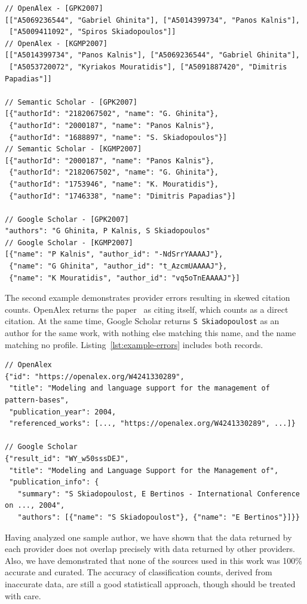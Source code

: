 \begin{lstlisting}[float=tb, basicstyle=\footnotesize\ttfamily, caption={Authors of {[GPK2007]} and {[KGMP2007]}, as returned by providers}, label={lst:example-coauthor}]
// OpenAlex - [GPK2007]
[["A5069236544", "Gabriel Ghinita"], ["A5014399734", "Panos Kalnis"],
 ["A5009411092", "Spiros Skiadopoulos"]]
// OpenAlex - [KGMP2007]
[["A5014399734", "Panos Kalnis"], ["A5069236544", "Gabriel Ghinita"],
 ["A5053720072", "Kyriakos Mouratidis"], ["A5091887420", "Dimitris Papadias"]]

// Semantic Scholar - [GPK2007]
[{"authorId": "2182067502", "name": "G. Ghinita"},
 {"authorId": "2000187", "name": "Panos Kalnis"},
 {"authorId": "1688897", "name": "S. Skiadopoulos"}]
// Semantic Scholar - [KGMP2007]
[{"authorId": "2000187", "name": "Panos Kalnis"},
 {"authorId": "2182067502", "name": "G. Ghinita"},
 {"authorId": "1753946", "name": "K. Mouratidis"},
 {"authorId": "1746338", "name": "Dimitris Papadias"}]

// Google Scholar - [GPK2007]
"authors": "G Ghinita, P Kalnis, S Skiadopoulos"
// Google Scholar - [KGMP2007]
[{"name": "P Kalnis", "author_id": "-NdSrrYAAAAJ"},
 {"name": "G Ghinita", "author_id": "t_AzcmUAAAAJ"},
 {"name": "K Mouratidis", "author_id": "vq5oTnEAAAAJ"}]
\end{lstlisting}

The second example demonstrates provider errors resulting in skewed citation counts.
\textsf{OpenAlex} returns the paper~\cite{Terrovitis2004} as citing itself, which counts as a \textsf{direct} citation.
At the same time, \textsf{Google Scholar} returns \texttt{S Skiadopoulost} as an author for the same work, with nothing else matching this name, and the name matching no profile.
Listing~\ref{lst:example-errors} includes both records.

\begin{lstlisting}[float=tb, basicstyle=\footnotesize\ttfamily, caption={Errors in the responses of \textsf{OpenAlex} and \textsf{Google Scholar}}, label={lst:example-errors}]
// OpenAlex
{"id": "https://openalex.org/W4241330289",
 "title": "Modeling and language support for the management of pattern-bases",
 "publication_year": 2004,
 "referenced_works": [..., "https://openalex.org/W4241330289", ...]}

// Google Scholar
{"result_id": "WY_w50sssDEJ",
 "title": "Modeling and Language Support for the Management of",
 "publication_info": {
   "summary": "S Skiadopoulost, E Bertinos - International Conference on ..., 2004",
   "authors": [{"name": "S Skiadopoulost"}, {"name": "E Bertinos"}]}}
\end{lstlisting}

Having analyzed one sample author, we have shown that the data returned by each provider does not overlap precisely with data returned by other providers.
Also, we have demonstrated that none of the sources used in this work was 100\% accurate and curated.
The accuracy of classification counts, derived from inaccurate data, are still a good statisticall approach, though should be treated with care.
